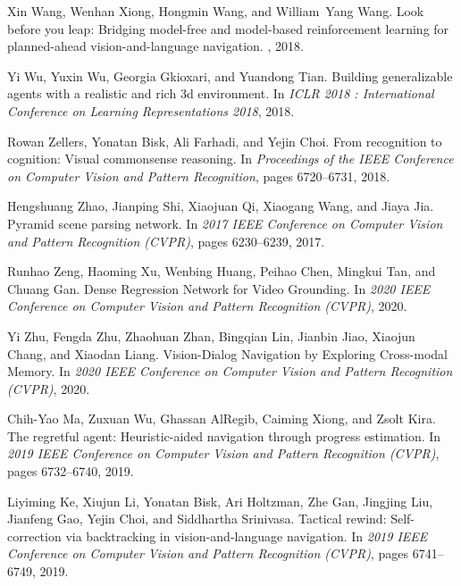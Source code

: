 \documentclass[10pt,twocolumn,letterpaper]{article}
\begin{document}
\begin{thebibliography}{10}
	Xin {Wang}, Wenhan {Xiong}, Hongmin {Wang}, and William~Yang {Wang}.
	\newblock Look before you leap: Bridging model-free and model-based
	reinforcement learning for planned-ahead vision-and-language navigation.
	, 2018.
	
	Yi {Wu}, Yuxin {Wu}, Georgia {Gkioxari}, and Yuandong {Tian}.
	\newblock Building generalizable agents with a realistic and rich 3d
	environment.
	\newblock In {\em ICLR 2018 : International Conference on Learning
		Representations 2018}, 2018.
	
	Rowan {Zellers}, Yonatan {Bisk}, Ali {Farhadi}, and Yejin {Choi}.
	\newblock From recognition to cognition: Visual commonsense reasoning.
	\newblock In {\em Proceedings of the IEEE Conference on Computer Vision and
		Pattern Recognition}, pages 6720--6731, 2018.
	
	Hengshuang {Zhao}, Jianping {Shi}, Xiaojuan {Qi}, Xiaogang {Wang}, and Jiaya
	{Jia}.
	\newblock Pyramid scene parsing network.
	\newblock In {\em 2017 IEEE Conference on Computer Vision and Pattern
		Recognition (CVPR)}, pages 6230--6239, 2017.
		
	Runhao {Zeng}, Haoming {Xu}, Wenbing {Huang}, Peihao {Chen}, Mingkui
	{Tan}, and Chuang {Gan}.
	\newblock Dense Regression Network for Video Grounding.
	\newblock In {\em 2020 IEEE Conference on Computer Vision and Pattern
		Recognition (CVPR)}, 2020.
	
	Yi {Zhu}, Fengda {Zhu}, Zhaohuan {Zhan}, Bingqian {Lin}, Jianbin
	{Jiao},  Xiaojun {Chang}, and Xiaodan {Liang}.
	\newblock Vision-Dialog Navigation by Exploring Cross-modal Memory.
	\newblock In {\em 2020 IEEE Conference on Computer Vision and Pattern
		Recognition (CVPR)}, 2020.
	
	Chih-Yao {Ma}, Zuxuan {Wu}, Ghassan {AlRegib}, Caiming {Xiong}, and Zsolt
	{Kira}.
	\newblock The regretful agent: Heuristic-aided navigation through progress estimation.
	\newblock In {\em 2019 IEEE Conference on Computer Vision and Pattern
		Recognition (CVPR)}, pages 6732--6740, 2019.
	
	Liyiming {Ke}, Xiujun {Li}, Yonatan {Bisk}, Ari {Holtzman}, Zhe
	{Gan}, Jingjing {Liu}, Jianfeng {Gao}, Yejin {Choi}, and Siddhartha {Srinivasa}.
	\newblock Tactical rewind: Self-correction via backtracking in vision-and-language navigation.
	\newblock In {\em 2019 IEEE Conference on Computer Vision and Pattern
		Recognition (CVPR)}, pages 6741--6749, 2019.
	

\end{thebibliography}
\end{document}
